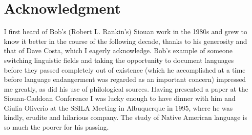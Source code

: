\documentclass[output=paper]{LSP/langsci}
\begin{document}
\section*{Acknowledgment}
I first heard of Bob's (Robert L. Rankin's) Siouan work in the 1980s and grew to know it better in the course of the following decade, thanks to his generosity and that of Dave Costa, which I eagerly acknowledge. Bob's example of someone switching linguistic fields and taking the opportunity to document languages before they passed completely out of existence (which he accomplished at a time before language endangerment was regarded as an important concern) impressed me greatly, as did his use of philological sources. Having presented a paper at the Siouan-Caddoan Conference I was lucky enough to have dinner with him and Giulia Oliverio at the SSILA Meeting in Albuquerque in 1995, where he was kindly, erudite and hilarious company. The study of Native American language is so much the poorer for his passing.

\printbibliography[heading=subbibliography,notkeyword=this]
\end{document}
